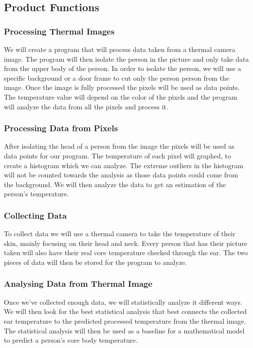 \documentclass[10pt, draftclsnofoot, onecolumn]{IEEEtran}
\begin{document}
	\subsection{Product Functions}
		\subsubsection{Processing Thermal Images}
		We will create a program that will process data taken from a thermal camera image. The program will then isolate the person in the picture and only take data from the upper body of the person. In order to isolate the person, we will use a specific background or a door frame to cut only the person person from the image. Once the image is fully processed the pixels will be used as data points. The temperature value will depend on the color of the pixels and the program will analyze the data from all the pixels and process it. 
		\subsubsection{Processing Data from Pixels}
		After isolating the head of a person from the image the pixels will be used as data points for our program. The temperature of each pixel will graphed, to create a histogram which we can analyze. The extreme outliers in the histogram will not be counted towards the analysis as those data points could come from the background. We will then analyze the data to get an estimation of the person’s temperature.
		\subsubsection{Collecting Data}
		To collect data we will use a thermal camera to take the temperature of their skin, mainly focusing on their head and neck. Every person that has their picture taken will also have their real core temperature checked through the ear. The two pieces of data will then be stored for the program to analyze.
		\subsubsection{Analysing Data from Thermal Image}
		Once we’ve collected enough data, we will statistically analyze it different ways. We will then look for the best statistical analysis that best connects the collected ear temperature to the predicted processed temperature from the thermal image. The statistical analysis will then be used as a baseline for a mathematical model to predict a person’s core body temperature.
\end{document}
